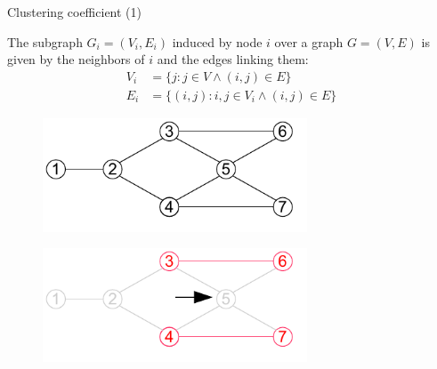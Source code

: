 \begin{frame}{Clustering coefficient (1)}

\begin{definition}
The subgraph $G_i=(V_i, E_i)$ \alert{induced} by node $i$ over a graph $G=(V,E)$ 
  is given by the neighbors of $i$ and the edges linking them:
  \begin{align*}
	 V_i &= \{ j : j \in V \wedge (i,j) \in E \} \\
	 E_i &= \{ (i,j) : i,j \in V_i \wedge (i,j) \in E \} 
  \end{align*}
\end{definition}

\bigskip
\begin{overprint}
\begin{figure}
\includegraphics[width=0.7\textwidth]{figs/08/induced1}
\end{figure}
\begin{figure}
\includegraphics[width=0.7\textwidth]{figs/08/induced2}
\end{figure}
\end{overprint}
\end{frame}

